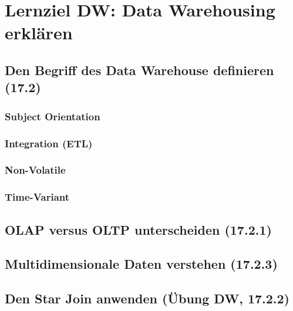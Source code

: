 \section{Lernziel DW: Data Warehousing erklären}

\subsection{Den Begriff des Data Warehouse definieren (17.2)}

\subsubsection{Subject Orientation}

\subsubsection{Integration (ETL)}

\subsubsection{Non-Volatile}

\subsubsection{Time-Variant}

\subsection{OLAP versus OLTP unterscheiden (17.2.1)}

\subsection{Multidimensionale Daten verstehen (17.2.3)}

\subsection{Den Star Join anwenden (Übung DW, 17.2.2)}